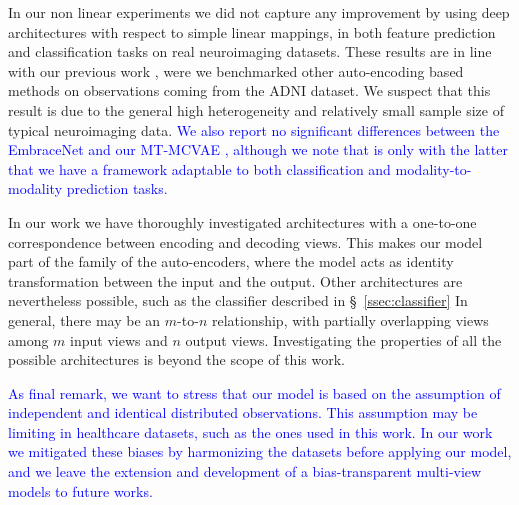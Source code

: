 In our non linear experiments we did not capture any improvement by using deep architectures with respect to simple linear mappings,
in both feature prediction  and classification tasks  on real neuroimaging datasets.
These results are in line with our previous work \citep{Antelmi2019}, were we benchmarked other auto-encoding based methods on observations coming from the ADNI dataset.
We suspect that this result is due to the general high heterogeneity and relatively small sample size of typical neuroimaging data.
\textcolor{blue}{
	We also report no significant differences between the EmbraceNet and our MT-MCVAE ,
	although we note that is only with the latter that we have a framework adaptable to both classification and modality-to-modality prediction tasks.
}

In our work we have thoroughly investigated architectures with a one-to-one correspondence between encoding and decoding views.
This makes our model part of the family of the auto-encoders, where the model acts as identity transformation between the input and the output.
Other architectures are nevertheless possible, such as the classifier described in \S~\ref{ssec:classifier}
In general, there may be an $m$-to-$n$ relationship, with partially overlapping views among $m$ input views and $n$ output views.
Investigating the properties of all the possible architectures is beyond the scope of this work.

\textcolor{blue}{
	As final remark, we want to stress that our model is based on the assumption of independent and identical distributed observations.
	This assumption may be limiting in healthcare datasets, such as the ones used in this work.
	In our work we mitigated these biases by harmonizing the datasets before applying our model, and we leave the extension and development of a bias-transparent multi-view models to future works.
}
